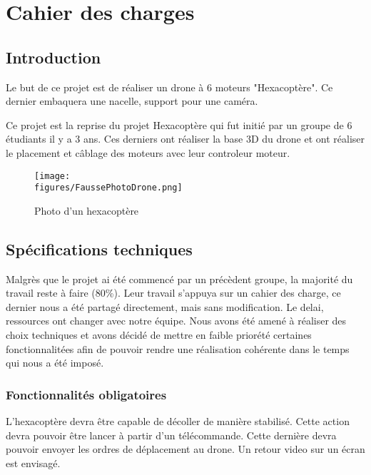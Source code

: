 \chapter{Cahier des charges}
\label{chapter1}



\section{Introduction}

Le but de ce projet est de réaliser un drone à 6 moteurs "Hexacoptère".  Ce dernier embaquera une nacelle, support pour une caméra.

\vspace{1cm}
Ce projet est la reprise du projet Hexacoptère qui fut initié par un groupe de 6 étudiants il y a 3 ans.  Ces derniers ont réaliser la base 3D du drone et ont réaliser le placement et câblage des moteurs avec leur controleur moteur.

\begin{figure}[H]
	\centering
    \texttt{[image: \\figures/FaussePhotoDrone.png]}
    \decoRule
    \caption[
    Photo d'un hexacoptère]{
    Photo d'un hexacoptère}
    \label{fig:Photo d'un hexacoptère   }
	\end{figure}


\section{Spécifications techniques}

Malgrès que le projet ai été commencé par un précèdent groupe, la majorité du travail reste à faire (80\%). Leur travail s'appuya sur un cahier des charge, ce dernier nous a été partagé directement, mais sans modification. Le delai, ressources ont changer avec notre équipe. 
Nous avons été amené à réaliser des choix techniques et avons décidé de mettre en faible priorété certaines fonctionnalitées afin de pouvoir rendre une réalisation cohérente dans le temps qui nous a été imposé.

\subsection{Fonctionnalités obligatoires}

L'hexacoptère devra être capable de décoller de manière stabilisé. Cette action devra pouvoir être lancer à partir d'un télécommande. \newline 
Cette dernière devra pouvoir envoyer les ordres de déplacement au drone.  Un retour video sur un écran est envisagé.

